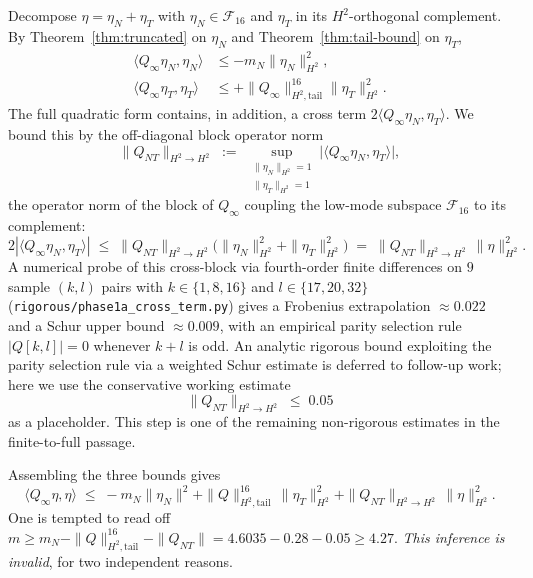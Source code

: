 \documentclass[11pt]{amsart}
\theoremstyle{plain}
\theoremstyle{definition}
\begin{document}
Decompose $\eta = \eta_{N} + \eta_{T}$ with $\eta_{N} \in
\mathcal{F}_{16}$ and $\eta_{T}$ in its $H^{2}$-orthogonal complement.
By Theorem~\ref{thm:truncated} on $\eta_{N}$ and
Theorem~\ref{thm:tail-bound} on $\eta_{T}$,
\begin{align*}
  \langle Q_{\infty} \eta_{N}, \eta_{N} \rangle
   &\leq -m_{N} \|\eta_{N}\|_{H^{2}}^{2}, \\
  \langle Q_{\infty} \eta_{T}, \eta_{T} \rangle
   &\leq +\|Q_{\infty}\|_{H^{2}, \mathrm{tail}}^{16}
         \|\eta_{T}\|_{H^{2}}^{2}.
\end{align*}
The full quadratic form contains, in addition, a cross term
$2 \langle Q_{\infty} \eta_{N}, \eta_{T}\rangle$.  We bound this
by the off-diagonal block operator norm
\begin{equation}\label{eq:QNT-def}
  \|Q_{NT}\|_{H^{2} \to H^{2}}
   \;:=\; \sup_{\substack{\|\eta_{N}\|_{H^{2}} = 1 \\
                          \|\eta_{T}\|_{H^{2}} = 1}}
          \bigl| \langle Q_{\infty} \eta_{N}, \eta_{T}\rangle \bigr|,
\end{equation}
the operator norm of the block of $Q_{\infty}$ coupling the
low-mode subspace $\mathcal{F}_{16}$ to its complement:
\begin{equation}\label{eq:cross-term-young}
  2 |\langle Q_{\infty} \eta_{N}, \eta_{T}\rangle|
   \;\leq\; \|Q_{NT}\|_{H^{2} \to H^{2}}
            \bigl(\|\eta_{N}\|_{H^{2}}^{2} +
                  \|\eta_{T}\|_{H^{2}}^{2}\bigr)
   \;=\; \|Q_{NT}\|_{H^{2} \to H^{2}}\, \|\eta\|_{H^{2}}^{2}.
\end{equation}
A numerical probe of this cross-block via fourth-order finite
differences on $9$ sample $(k, l)$ pairs with
$k \in \{1, 8, 16\}$ and $l \in \{17, 20, 32\}$
(\texttt{rigorous/phase1a\_cross\_term.py}) gives a Frobenius
extrapolation $\approx 0.022$ and a Schur upper bound $\approx 0.009$,
with an empirical parity selection rule $|Q[k,l]| = 0$ whenever
$k + l$ is odd.  An analytic rigorous bound exploiting the parity
selection rule via a weighted Schur estimate is deferred to follow-up
work; here we use the conservative working estimate
\begin{equation}\label{eq:cross-term-working}
  \|Q_{NT}\|_{H^{2} \to H^{2}} \;\leq\; 0.05
\end{equation}
as a placeholder.  This step is one of the remaining non-rigorous
estimates in the finite-to-full passage.

Assembling the three bounds gives
\begin{equation}\label{eq:assembled}
  \langle Q_{\infty} \eta, \eta \rangle \;\leq\;
    -m_{N}\|\eta_{N}\|^{2}
    + \|Q\|_{H^{2},\mathrm{tail}}^{16}\,\|\eta_{T}\|_{H^{2}}^{2}
    + \|Q_{NT}\|_{H^{2}\to H^{2}}\,\|\eta\|_{H^{2}}^{2}.
\end{equation}
One is tempted to read off $m \geq m_{N} -
\|Q\|^{16}_{H^{2},\mathrm{tail}} - \|Q_{NT}\|
= 4.6035 - 0.28 - 0.05 \geq 4.27$.  \emph{This inference is invalid},
for two independent reasons.
\end{document}
